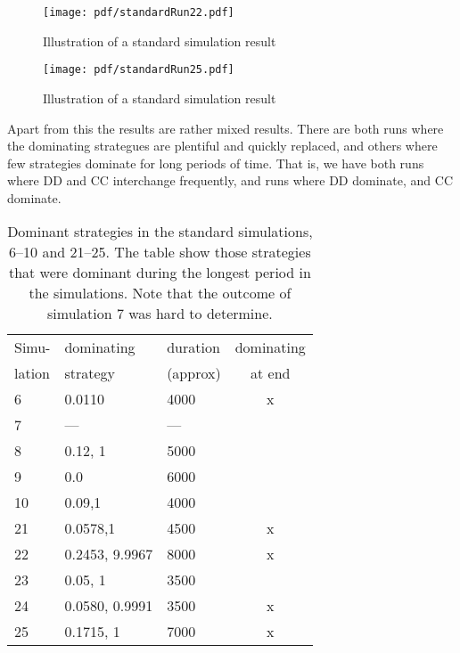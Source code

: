 \begin{figure}[htbp]
\centering
\texttt{[image: pdf/standardRun22.pdf]}
\caption{Illustration of a standard simulation result}
\label{fig:results:example:2}
\end{figure}

\begin{figure}[htbp]
\centering
\texttt{[image: pdf/standardRun25.pdf]}
\caption{Illustration of a standard simulation result}
\label{fig:results:example:3}
\end{figure}

Apart from this the results are rather mixed results. There are both runs where the dominating strategues are plentiful and quickly replaced, and others where few strategies dominate for long periods of time. That is, we have both runs where DD and CC interchange frequently, and runs where DD dominate, and CC dominate.


\begin{table}[!hbtp]
  \centering
  \caption{Dominant strategies in the standard simulations, 6--10 and
    21--25. The table show those strategies that were dominant during
    the longest period in the simulations. Note that the outcome of
    simulation 7 was hard to determine.}
  \label{tab:results:dominant:6}
  \footnotesize
  \begin{tabular}{lllc}
    Simu-  & dominating & duration  & dominating \\
    lation & strategy   & (approx)  & at end \\
    \hline
    6  & 0.0110         & 4000 & x \\          
    7  & ---            & --- &            \\
    8  & 0.12, 1        & 5000 &            \\ 
    9  & 0.0            & 6000 &            \\ 
    10 & 0.09,1         & 4000 &            \\ 
    21 & 0.0578,1       & 4500 & x \\          
    22 & 0.2453, 9.9967 & 8000 & x \\          
    23 & 0.05, 1        & 3500 &            \\ 
    24 & 0.0580, 0.9991 & 3500 & x \\          
    25 & 0.1715, 1      & 7000 & x \\          
    \hline
  \end{tabular}
\end{table}

